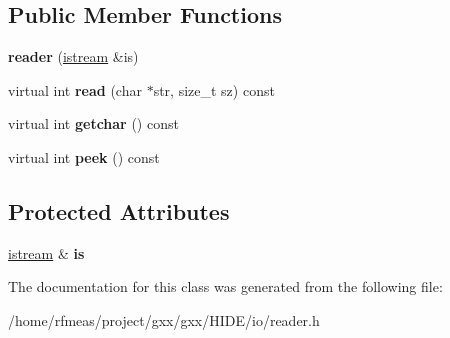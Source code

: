 \subsection*{Public Member Functions}
\begin{DoxyCompactItemize}
\item 
{\bfseries reader} (\hyperlink{classgxx_1_1istream}{istream} \&is)\hypertarget{classgxx_1_1reader_a647e2a0c38ee22246926eb58f6a450fe}{}\label{classgxx_1_1reader_a647e2a0c38ee22246926eb58f6a450fe}

\item 
virtual int {\bfseries read} (char $\ast$str, size\+\_\+t sz) const \hypertarget{classgxx_1_1reader_ab274bcc71b9354d47c03268e87fed272}{}\label{classgxx_1_1reader_ab274bcc71b9354d47c03268e87fed272}

\item 
virtual int {\bfseries getchar} () const \hypertarget{classgxx_1_1reader_a2802ff2c649dca7a1e3b202964e5da1f}{}\label{classgxx_1_1reader_a2802ff2c649dca7a1e3b202964e5da1f}

\item 
virtual int {\bfseries peek} () const \hypertarget{classgxx_1_1reader_a3d181a7f0bcf3bd62df604af6e077078}{}\label{classgxx_1_1reader_a3d181a7f0bcf3bd62df604af6e077078}

\end{DoxyCompactItemize}
\subsection*{Protected Attributes}
\begin{DoxyCompactItemize}
\item 
\hyperlink{classgxx_1_1istream}{istream} \& {\bfseries is}\hypertarget{classgxx_1_1reader_adcfa52d9652509183665ed69cbf83d18}{}\label{classgxx_1_1reader_adcfa52d9652509183665ed69cbf83d18}

\end{DoxyCompactItemize}


The documentation for this class was generated from the following file\+:\begin{DoxyCompactItemize}
\item 
/home/rfmeas/project/gxx/gxx/\+H\+I\+D\+E/io/reader.\+h\end{DoxyCompactItemize}
